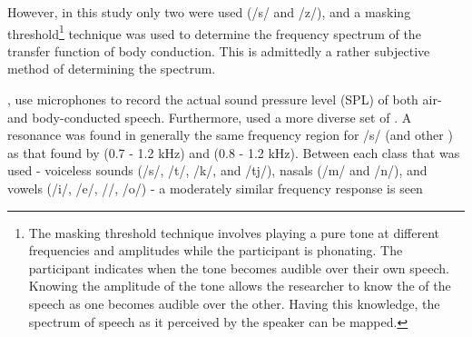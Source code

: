 However, in this study only two \DIFdelbegin {}\DIFdelend \DIFaddbegin {}\DIFaddend were used (/s/ and /z/), and a masking threshold\footnote{The masking threshold technique involves playing a pure tone at different frequencies and amplitudes while the participant is phonating. The participant indicates when the tone becomes audible over their own speech. Knowing the amplitude of the tone allows the researcher to know the \DIFdelbegin {}\DIFdelend \DIFaddbegin {}\DIFaddend of the \DIFaddbegin {}\DIFaddend speech as one becomes audible over the other. Having this knowledge, the spectrum of speech as it \DIFdelbegin {}\DIFdelend \DIFaddbegin {}\DIFaddend perceived by the speaker can \DIFdelbegin {}\DIFdelend be mapped.} technique was used to determine the frequency spectrum of the transfer function of body conduction.  This is admittedly a rather subjective method of determining the spectrum.  

\cite{reinfeldt:10}, use microphones to record the actual sound pressure level (SPL) of both air- and body-conducted speech. Furthermore, \cite{reinfeldt:10} used a more diverse set of \DIFdelbegin {}\DIFdelend \DIFaddbegin {}\DIFaddend .  A resonance was found in generally the same frequency region for /s/ (and other \DIFdelbegin {}\DIFdelend \DIFaddbegin {}\DIFaddend ) as that found by \cite{porschmann:00} (0.7 - 1.2 kHz) and \cite{hakansson:94} (0.8 - 1.2 kHz). %
Between each \DIFaddbegin {}\DIFaddend class that was used - voiceless sounds (/s/, /t/, /k/, and /tj/),  nasals (/m/ and /n/), and vowels (/i/, /e/, /\DIFdelbegin {}\DIFdelend \DIFaddbegin {}\DIFaddend /, /o/) - a moderately similar frequency response is seen\DIFdelbegin {}%

